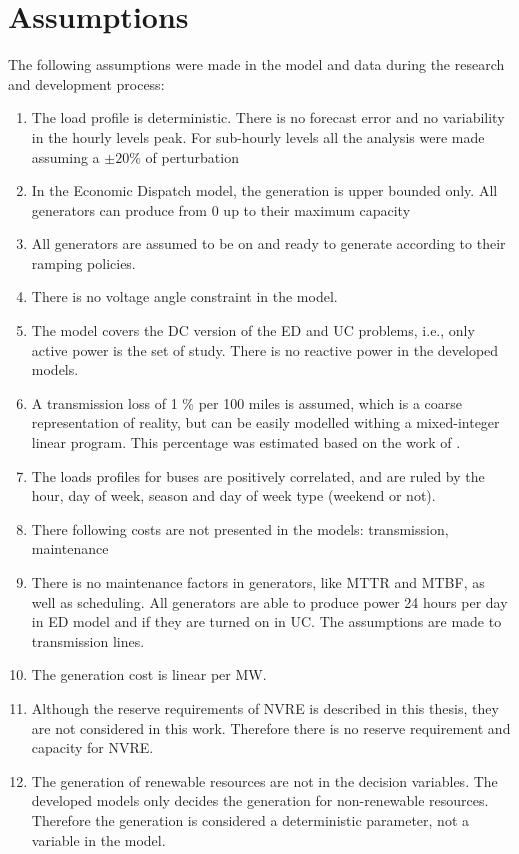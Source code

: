 \documentclass[12pt,LUDisStyle,twosided]{book}
\begin{document}
\section{Assumptions}

The following assumptions were made in the model and data during the research and development process:

\begin{enumerate}
\item The load profile is deterministic. There is no forecast error and no variability in the hourly levels peak. For sub-hourly levels all the analysis were made assuming a $\pm20\%$ of perturbation
\item In the Economic Dispatch model, the generation is upper bounded only. All generators can produce from 0 up to their maximum capacity
\item All generators are assumed to be on and ready to generate according to their ramping policies.
\item There is no voltage angle constraint in the model.
\item The model covers the DC version of the ED and UC problems, i.e., only active power is the set of study. There is no reactive power in the developed models.
\item A transmission loss of 1 \% per 100 miles is assumed, which is a coarse representation of reality, but can be easily modelled withing a mixed-integer linear program. This percentage was estimated based on the work of \citeauthor{short} \cite{short}.
\item The loads profiles for buses are positively correlated, and are ruled by the hour, day of week, season and day of week type (weekend or not).
\item There following costs are not presented in the models: transmission, maintenance
\item There is no maintenance factors in generators, like MTTR and MTBF, as well as scheduling. All generators are able to produce power 24 hours per day in ED model and if they are turned on in UC. The assumptions are made to transmission lines.
\item The generation cost is linear per MW.
\item Although the reserve requirements of NVRE is described in this thesis, they are not considered in this work. Therefore there is no reserve requirement and capacity for NVRE.
\item The generation of renewable resources are not in the decision variables. The developed models only decides the generation for non-renewable resources. Therefore the generation is considered a deterministic parameter, not a variable in the model.

\end{enumerate}
\end{document}
